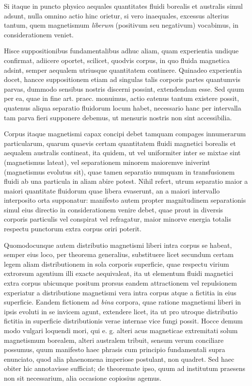 Si itaque in puncto physico aequales quantitates fluidi borealis et australis simul adsunt, nulla omnino actio hinc orietur, si vero inaequales, excessus alterius tantum, quem magnetismum \textit{liberum} (positivum seu negativum) vocabimus, in considerationem veniet.

Hisce suppositionibus fundamentalibus adhuc aliam, quam experientia undique confirmat, adiicere oportet, scilicet, quodvis corpus, in quo fluida magnetica adsint, semper aequalem utriusque quantitatem continere. Quinadeo experientia docet, hancce suppositionem etiam ad singulas talis corporis partes quantumvis parvas, dummodo sensibus nostris discerni possint, extendendam esse. Sed quum per ea, quae in fine art. praec. monuimus, actio eatenus tantum existere possit, quatenus aliqua separatio fluidorum locum habet, necessario hanc per intervalla tam parva fieri supponere debemus, ut mensuris nostris non sint accessibilia.

Corpus itaque magnetismi capax concipi debet tamquam compages innumerarum particularum, quarum quaevis certam quantitatem fluidi magnetici borealis et aequalem australis contineat, ita quidem, ut vel uniformiter inter se mixtae sint (magnetismus lateat), vel separationem minorem maioremve iniverint (magnetismus evolutus sit), quae tamen separatio numquam in transfusionem fluidi ab una particula in aliam abire potest. Nihil refert, utrum separatio maior a maiori quantitate fluidorum quae libera evaserunt, an a maiori intervallo interposito orta supponatur: manifesto autem propter magnitudinem separationis simul eius directio in considerationem venire debet, quae prout in diversis corporis particulis vel conspirat vel refragatur, maior minorve energia totalis respectu punctorum extra corpus oriri poterit.

Quomodocunque autem distributio magnetismi liberi intra corpus se habeat, semper eius loco, per theorema generalius, substituere licet secundum certam legem aliam distributionem in sola corporis superficie, quae respectu virium extrorsum agentium illi exacte aequivaleat, ita ut elementum fluidi magnetici extra corpus ubicunque positum prorsus eandem attractionem vel repulsionem experiatur a distributione magnetismi vera intra corpus atque a fictitia in eius superficie. Eandem fictionem ad \textit{bina} corpora, quae ratione magnetismi liberi in ipsis evoluti in se invicem agunt, extendere licet, ita ut pro utroque distributio fictitia in superficie distributionis verae internae vice fungi possit. Hocce demum modo vulgari loquendi mori, qui e. g. alteri acus magneticae extremitati solum magnetismum borealem, alteri australem tribuit, sensum verum conciliare possumus, quum manifesto haec phrasis cum principio fundamentali supra enunciato, quod alia phaenomena imperiose postulant, non quadret. Sed haec obiter hic annotavisse sufficiat; de theoremate ipso, quum ad institutum praesens non sit necessarium, alia occasione copiosius agemus.

